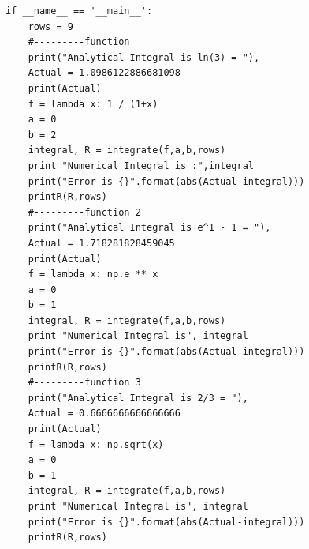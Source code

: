 \documentclass[a4paper,11pt]{article}
\begin{document}
{\begin{lstlisting}
if __name__ == '__main__':
    rows = 9
    #---------function 
    print("Analytical Integral is ln(3) = "),
    Actual = 1.0986122886681098
    print(Actual)
    f = lambda x: 1 / (1+x)
    a = 0
    b = 2
    integral, R = integrate(f,a,b,rows)
    print "Numerical Integral is :",integral
    print("Error is {}".format(abs(Actual-integral)))
    printR(R,rows)
    #---------function 2
    print("Analytical Integral is e^1 - 1 = "),
    Actual = 1.718281828459045
    print(Actual)
    f = lambda x: np.e ** x 
    a = 0
    b = 1
    integral, R = integrate(f,a,b,rows)
    print "Numerical Integral is", integral
    print("Error is {}".format(abs(Actual-integral)))
    printR(R,rows)
    #---------function 3
    print("Analytical Integral is 2/3 = "),
    Actual = 0.6666666666666666
    print(Actual)
    f = lambda x: np.sqrt(x) 
    a = 0
    b = 1
    integral, R = integrate(f,a,b,rows)
    print "Numerical Integral is", integral
    print("Error is {}".format(abs(Actual-integral)))
    printR(R,rows)

\end{lstlisting}
}

\clearpage
\end{document}
